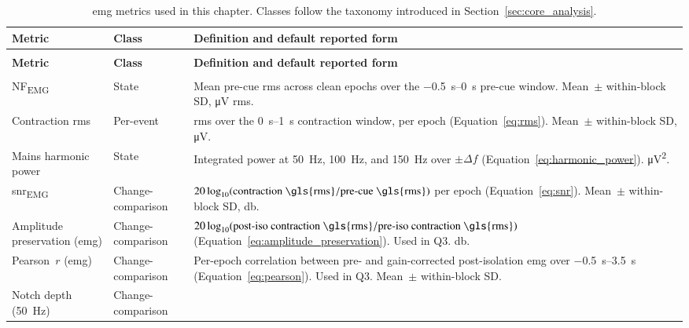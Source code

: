 \newlength{\widetable}
\setlength{\widetable}{\textwidth}
\addtolength{\widetable}{2cm}

{\small
\begin{xltabular}{\widetable}{>{\raggedright\arraybackslash}p{3.6cm} l >{\raggedright\arraybackslash}X}
\caption{\gls{emg} metrics used in this chapter. Classes follow the taxonomy introduced in Section~\ref{sec:core_analysis}.}
\label{tab:emg-metrics} \\
\toprule
\textbf{Metric} & \textbf{Class} & \textbf{Definition and default reported form} \\
\midrule
\endfirsthead
{} \\
\toprule
\textbf{Metric} & \textbf{Class} & \textbf{Definition and default reported form} \\
\midrule
\endhead
\midrule
{} \\
\endfoot
\bottomrule
\endlastfoot
NF\textsubscript{EMG} & State &
Mean pre-cue \gls{rms} across clean epochs over the \SIrange{-0.5}{0}{\second} pre-cue window. Mean~$\pm$ within-block SD, \si{\micro\volt} \gls{rms}. \\
\addlinespace
Contraction \gls{rms} & Per-event &
\gls{rms} over the \SIrange{0}{1}{\second} contraction window, per epoch (Equation~\ref{eq:rms}). Mean~$\pm$ within-block SD, \si{\micro\volt}. \\
\addlinespace
Mains harmonic power & State &
Integrated power at \SI{50}{\hertz}, \SI{100}{\hertz}, and \SI{150}{\hertz} over $\pm\Delta f$ (Equation~\ref{eq:harmonic_power}). \si{\micro\volt^2}. \\
\addlinespace
\gls{snr}\textsubscript{EMG} & Change-comparison &
$20\log_{10}(\text{contraction \gls{rms}} / \text{pre-cue \gls{rms}})$ per epoch (Equation~\ref{eq:snr}). Mean~$\pm$ within-block SD, \si{\decibel}. \\
\addlinespace
Amplitude preservation (\gls{emg}) & Change-comparison &
$20\log_{10}(\text{post-iso contraction \gls{rms}} / \text{pre-iso contraction \gls{rms}})$ (Equation~\ref{eq:amplitude_preservation}). Used in Q3. \si{\decibel}. \\
\addlinespace
Pearson~$r$ (\gls{emg}) & Change-comparison &
Per-epoch correlation between pre- and gain-corrected post-isolation \gls{emg} over \SIrange{-0.5}{3.5}{\second} (Equation~\ref{eq:pearson}). Used in Q3. Mean~$\pm$ within-block SD. \\
\addlinespace
Notch depth (\SI{50}{\hertz}) & Change-comparison &

\end{xltabular}}
